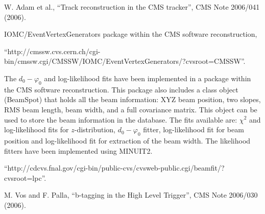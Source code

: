 \documentclass{cmspaper}
\begin{document}
\begin{thebibliography}{9}
W. Adam et al., ``Track reconstruction in the CMS tracker'', CMS Note 2006/041 (2006).


IOMC/EventVertexGenerators package within the CMS software reconstruction, 

``http://cmssw.cvs.cern.ch/cgi-bin/cmssw.cgi/CMSSW/IOMC/EventVertexGenerators/?cvsroot=CMSSW''.

The $d_0 - \varphi_0$ and log-likelihood fits have been implemented in a package
within the CMS software reconstruction. This package also includes a class object (BeamSpot) that holds all the beam information: 
XYZ beam position, two slopes, RMS beam length, beam width, and a full covariance matrix. This
object can be used to store the beam information in the database.
The fits available are: $\chi^2$ and log-likelihood fits for $z$-distribution,
$d_0 - \varphi_0$ fitter, log-likelihood fit for beam position and  
log-likelihood fit for extraction of the beam width. The likelihood fitters have been implemented
using MINUIT2.

``http://cdcvs.fnal.gov/cgi-bin/public-cvs/cvsweb-public.cgi/beamfit/?cvsroot=lpc''.

M. Vos and F. Palla, ``b-tagging in the High Level Trigger'', CMS Note 2006/030 (2006).







\end{thebibliography}


 
\end{document}
